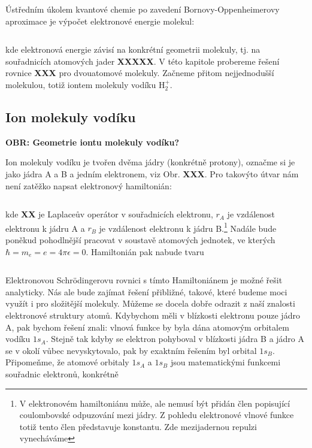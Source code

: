Ústředním úkolem kvantové chemie po zavedení Bornovy-Oppenheimerovy aproximace je výpočet elektronové energie molekul:

\begin{equation}
\label{rov:XXX}
\end{equation}

\noindent kde elektronová energie závisí na konkrétní geometrii molekuly, tj. na souřadnicích atomových jader \textbf{XXXXX}. V této kapitole probereme řešení rovnice \textbf{XXX} pro dvouatomové molekuly. Začneme přitom nejjednodušší molekulou, totiž iontem molekuly vodíku H$_2^+$.   

\subsection{Ion molekuly vodíku}

\bigskip
\textbf{OBR: Geometrie iontu molekuly vodíku?} 
\bigskip

Ion molekuly vodíku je tvořen dvěma jádry (konkrétně protony), označme si je jako jádra A a B a jedním elektronem, viz Obr. \textbf{XXX}. Pro takovýto útvar nám není zatěžko napsat elektronový hamiltonián:

\begin{equation}
\label{rov:XXX}
\end{equation}


\noindent
kde \textbf{XX} je Laplaceův operátor v souřadnicích elektronu, $r_A$ je vzdálenost elektronu k jádru A a $r_B$ je vzdálenost elektronu k jádru B.\footnote{V elektronovém hamiltoniánu může, ale nemusí být přidán člen popisující coulombovské odpuzování mezi jádry. Z pohledu elektronové vlnové funkce totiž tento člen představuje konstantu. Zde mezijadernou repulzi vynecháváme}  Nadále bude poněkud pohodlnější pracovat v soustavě atomových jednotek, ve kterých $\hbar=m_e=e=4\pi \epsilon = 0$. Hamiltonián pak nabude tvaru

\begin{equation}
\label{rov:XXX}
\end{equation}

Elektronovou Schr\"odingerovu rovnici s tímto Hamiltoniánem je možné řešit analyticky. Nás ale bude zajímat řešení přibližné, takové, které budeme moci využít i pro složitější molekuly. Můžeme se docela dobře odrazit z naší znalosti elektronové struktury atomů. Kdybychom měli v blízkosti elektronu pouze jádro A, pak bychom řešení znali: vlnová funkce by byla dána atomovým orbitalem vodíku $1s_A$. Stejně tak kdyby se elektron pohyboval v blízkosti jádra B a jádro A se v okolí vůbec nevyskytovalo, pak by exaktním řešením byl orbital $1s_B$. Připomeňme, že atomové orbitaly $1s_A$ a $1s_B$ jsou matematickými funkcemi souřadnic elektronů, konkrétně

